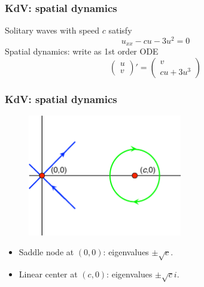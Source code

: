 \documentclass[16pt]{beamer}
\begin{document}
\begin{frame}
\frametitle{KdV: spatial dynamics}
\fontsize{16}{7.2}\selectfont
Solitary waves with speed $c$ satisfy
\[
u_{xx} - c u - 3 u^2 = 0
\]
Spatial dynamics: write as 1st order ODE
\[
\begin{pmatrix}u \\ v
\end{pmatrix}'
= \begin{pmatrix}
v \\ c u + 3 u^3
\end{pmatrix}
\]
\end{frame}

\begin{frame}
\frametitle{KdV: spatial dynamics}
\fontsize{16}{7.2}\selectfont
\begin{figure}[H]
\includegraphics[width=0.6\textwidth]{images/kdv3portrait1.eps}
\end{figure}
\begin{itemize}
\item Saddle node at $(0,0)$: eigenvalues $\pm \sqrt{c}$.
\item Linear center at $(c, 0)$: eigenvalues $\pm \sqrt{c} i$.
\end{itemize}
\end{frame}
\end{document}
